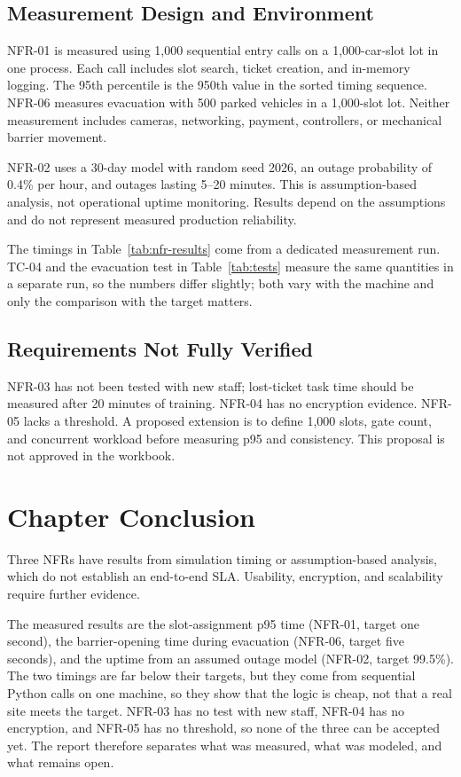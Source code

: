\subsection{Measurement Design and Environment}

NFR-01 is measured using 1,000 sequential entry calls on a 1,000-car-slot lot in one process. Each call includes slot search, ticket creation, and in-memory logging. The 95th percentile is the 950th value in the sorted timing sequence. NFR-06 measures evacuation with 500 parked vehicles in a 1,000-slot lot. Neither measurement includes cameras, networking, payment, controllers, or mechanical barrier movement.

NFR-02 uses a 30-day model with random seed 2026, an outage probability of 0.4\% per hour, and outages lasting 5--20 minutes. This is assumption-based analysis, not operational uptime monitoring. Results depend on the assumptions and do not represent measured production reliability.

The timings in Table~\ref{tab:nfr-results} come from a dedicated measurement run. TC-04 and the evacuation test in Table~\ref{tab:tests} measure the same quantities in a separate run, so the numbers differ slightly; both vary with the machine and only the comparison with the target matters.

\subsection{Requirements Not Fully Verified}
NFR-03 has not been tested with new staff; lost-ticket task time should be measured after 20 minutes of training. NFR-04 has no encryption evidence. NFR-05 lacks a threshold. A proposed extension is to define 1,000 slots, gate count, and concurrent workload before measuring p95 and consistency. This proposal is not approved in the workbook.

\section{Chapter Conclusion}
Three NFRs have results from simulation timing or assumption-based analysis, which do not establish an end-to-end SLA. Usability, encryption, and scalability require further evidence.

The measured results are the slot-assignment p95 time (NFR-01, target one second), the barrier-opening time during evacuation (NFR-06, target five seconds), and the uptime from an assumed outage model (NFR-02, target 99.5\%). The two timings are far below their targets, but they come from sequential Python calls on one machine, so they show that the logic is cheap, not that a real site meets the target. NFR-03 has no test with new staff, NFR-04 has no encryption, and NFR-05 has no threshold, so none of the three can be accepted yet. The report therefore separates what was measured, what was modeled, and what remains open.
